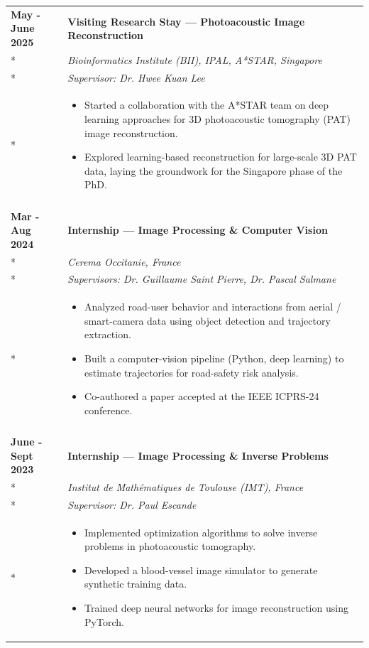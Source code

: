 \documentclass[a4paper,10pt]{article}
\begin{document}
\begin{longtable}{p{3cm}p{13cm}}
    {\bf May - June 2025} & {\bf Visiting Research Stay --- Photoacoustic Image Reconstruction} \\*
    & \emph{Bioinformatics Institute (BII), IPAL, A*STAR, Singapore} \\*
    & \emph{Supervisor: Dr. Hwee Kuan Lee} \\*
    & \begin{itemize}[leftmargin=*, noitemsep]
        \item Started a collaboration with the A*STAR team on deep learning approaches for 3D photoacoustic tomography (PAT) image reconstruction.
        \item Explored learning-based reconstruction for large-scale 3D PAT data, laying the groundwork for the Singapore phase of the PhD.
      \end{itemize} \\

    \vspace{0.2cm}\\
    {\bf Mar - Aug 2024} & {\bf Internship --- Image Processing \& Computer Vision} \\*
    & \emph{Cerema Occitanie, France} \\*
    & \emph{Supervisors: Dr. Guillaume Saint Pierre, Dr. Pascal Salmane} \\*
    & \begin{itemize}[leftmargin=*, noitemsep]
        \item Analyzed road-user behavior and interactions from aerial / smart-camera data using object detection and trajectory extraction.
        \item Built a computer-vision pipeline (Python, deep learning) to estimate trajectories for road-safety risk analysis.
        \item Co-authored a paper accepted at the IEEE ICPRS-24 conference.
      \end{itemize} \\
    \vspace{0.1cm}\\
    {\bf June - Sept 2023} & {\bf Internship --- Image Processing \& Inverse Problems} \\*
    & \emph{Institut de Mathématiques de Toulouse (IMT), France} \\*
    & \emph{Supervisor: Dr. Paul Escande} \\*
    & \begin{itemize}[leftmargin=*, noitemsep]
        \item Implemented optimization algorithms to solve inverse problems in photoacoustic tomography.
        \item Developed a blood-vessel image simulator to generate synthetic training data.
        \item Trained deep neural networks for image reconstruction using PyTorch.
      \end{itemize}
\end{longtable}
\end{document}
